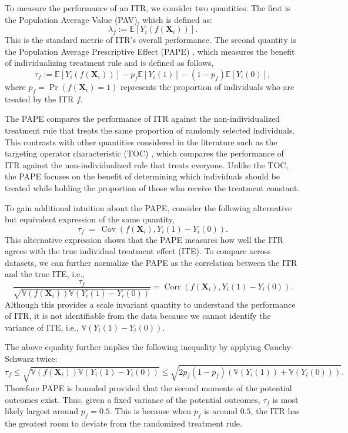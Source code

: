\documentclass[USenglish,onecolumn]{article}
\DeclareMathOperator\Cov{Cov}
\DeclareMathOperator\Corr{Corr}
\newcommand\E{\mathbb{E}}
\newcommand\V{\mathbb{V}}
\newcommand\bX{\bm{X}}
\begin{document}
To measure the performance of an ITR, we consider two quantities.  The
first is the Population Average Value (PAV), which is defined as:
\begin{equation}
  \lambda_f := \E[Y_i(f(\bX_i))]. \label{eq:PAV}
\end{equation}
This is the standard metric of ITR's overall performance.  The second
quantity is the Population Average Prescriptive Effect (PAPE)
\cite{radcliffe2007using,imai2021experimental}, which measures the
benefit of individualizing treatment rule and is defined as follows,
\begin{equation}
  \tau_f := \E[Y_i(f(\bX_i))]-p_f\E[Y_i(1)] - (1-p_f)\E[Y_i(0)], \label{eq:PAPE}
\end{equation}
where $p_f = \Pr(f(\bX_i) = 1)$ represents the proportion of
individuals who are treated by the ITR $f$.

The PAPE compares the performance of ITR against the
non-individualized treatment rule that treats the same proportion of
randomly selected individuals.  This contrasts with other quantities
considered in the literature such as the targeting operator
characteristic (TOC) \citep{yadlowsky2021evaluating}, which compares
the performance of ITR against the non-individualized rule that treats
everyone.  Unlike the TOC, the PAPE focuses on the benefit of
determining which individuals should be treated while holding the
proportion of those who receive the treatment constant.

To gain additional intuition about the PAPE, consider the following
alternative but equivalent expression of the same quantity,
\begin{equation*}
  \tau_f \ = \ \Cov(f(\bX_i), Y_i(1)-Y_i(0)).
\end{equation*}
This alternative expression shows that the PAPE measures how well the
ITR agrees with the true individual treatment effect (ITE).
To compare across datasets, we can further normalize the PAPE
as the correlation between the ITR and the true ITE, i.e.,
\begin{equation*}
  \frac{\tau_f}{\sqrt{\V(f(\bX_i))\V(Y_i(1)-Y_i(0))}} = \Corr(f(\bX_i), Y_i(1)-Y_i(0)). 
\end{equation*}
Although this provides a scale invariant quantity to understand the
performance of ITR, it is not identifiable from the data because we
cannot identify the variance of ITE, i.e.,
$\V(Y_i(1)-Y_i(0))$.

The above equality further implies the following inequality by applying Cauchy-Schwarz twice: 
\begin{equation}
  \tau_f\leq \sqrt{\V(f(\bX_i))\V(Y_i(1)-Y_i(0))} \leq \sqrt{2p_f(1-p_f)(\V(Y_i(1)) + \V(Y_i(0)))}.\label{eq:PAPEbound}
\end{equation}  
Therefore PAPE is bounded provided that the second moments of the potential outcomes
exist. Thus, given a fixed variance of the potential outcomes, $\tau_f$ is
most likely largest around $p_f=0.5$. This is because when $p_f$ is
around $0.5$, the ITR has the greatest room to deviate from the
randomized treatment rule.
\end{document}
